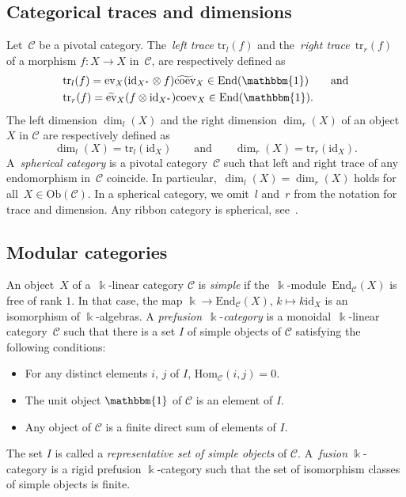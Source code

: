 \documentclass[pdftex]{sigma}
\numberwithin{equation}{section}
\newcommand{\co}{\colon}
\newcommand{\tens}{\otimes}
\newcommand{\id}{\mathrm{id}}
\newcommand{\ltr}[1]{\text{tr}_l(#1)}
\newcommand{\rtr}[1]{\text{tr}_r(#1)}
\newcommand{\mc}{\mathcal}
\newcommand{\Hom}{\mathrm{Hom}}
\newcommand{\End}{\text{End}}
\newcommand{\Ob}[1]{\mathrm{Ob}(#1)}
\newcommand{\kk}{\Bbbk}
\newcommand{\uu}{\mathbbm{1}}
\newcommand{\evl}{\text{ev}}
\newcommand{\evr}{\widetilde{\text{ev}}}
\newcommand{\coevl}{\text{coev}}
\newcommand{\coevr}{\widetilde{\text{coev}}}
\begin{document}
\subsection{Categorical traces and dimensions} %
Let~$\mc C$ be a pivotal category.
The~\textit{left trace} $\ltr{f}$ and the~\textit{right trace}~$\rtr{f}$ of a morphism $f\co X \to X$ in~$\mc C$, are respectively defined as
\begin{align*}
&\ltr{f}=\evl_{X}(\id_{X^*}\tens f)\coevr_X \in \End(\uu) \qquad \text{and} \\
&\rtr{f}=\evr_{X}(f\tens \id_{X^*})\coevl_X \in \End(\uu).
\end{align*}
The left dimension $\dim_l(X)$ and the right dimension $\dim_r(X)$ of an object $X$ in $\mc C$ are respectively defined as
\[\dim_l(X)=\ltr{\id_X} \qquad \text{and} \qquad \dim_r(X)=\rtr{\id_X}.\]
A~\textit{spherical category} is a pivotal category~$\mc C$ such that left and right trace of any endomorphism in~$\mc C$ coincide. In particular,~$\dim_l(X)=\dim_r(X)$ holds for all~$X \in\Ob{\mc C}$. In a spherical category, we omit~$l$ and~$r$ from the notation for trace and dimension. Any ribbon category is spherical, see~\cite[Corollary 3.4]{moncatstft}.

\subsection{Modular categories} \label{modular} An object~$X$ of a~$\kk$-linear category $\mc C$ is \textit{simple} if the~$\kk$-module~$\End_{\mc C}(X)$ is free of rank $1$. In that case, the map $\kk \to \End_{\mc C}(X)$, $k\mapsto k\id_X$ is an isomorphism of $\kk$-algebras. A \textit{prefusion}~$\kk$-\textit{category} is a monoidal~$\kk$-linear category~$\mc C$ such that there is a set $I$ of simple objects of $\mc C$ satisfying the following conditions:
\begin{itemize}\itemsep=0pt
	\item[$(a)$] For any distinct elements $i$, $j$ of $I$, $\Hom_{\mc C}(i,j)=0$.
	\item[$(b)$] The unit object $\uu$ of $\mc C$ is an element of $I$.
	\item[$(c)$] Any object of $\mc C$ is a finite direct sum of elements of $I$.
\end{itemize}
The set $I$ is called a \textit{representative set of simple objects} of $\mc C$.
A~\textit{fusion} $\kk$-category is a rigid prefusion $\kk$-category such that the set of isomorphism classes of simple objects is finite.
\end{document}
